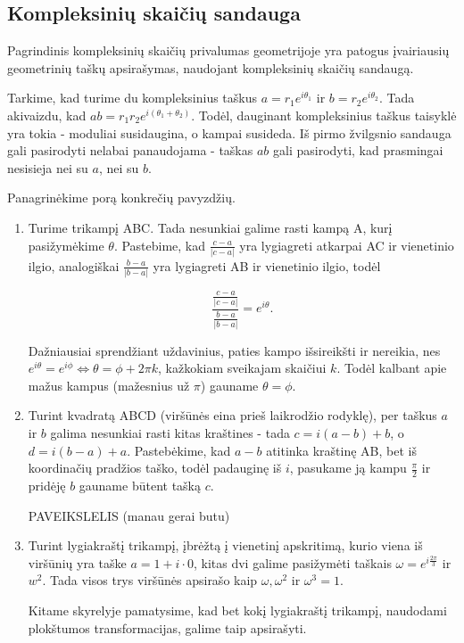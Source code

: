\documentclass[11pt,a4paper,twoside]{book}
\theoremstyle{definition} \newtheorem*{api}{Apibrėžimas}
\theoremstyle{remark} \newtheorem*{pastaba}{Pastaba}
\begin{document}
\subsection*{Kompleksinių skaičių sandauga}
Pagrindinis kompleksinių skaičių privalumas geometrijoje yra patogus įvairiausių geometrinių taškų apsirašymas, naudojant kompleksinių skaičių sandaugą.

Tarkime, kad turime du kompleksinius taškus $a=r_1 e^{i\theta _1}$ ir $b=r_2 e^{i\theta_2}$. Tada akivaizdu, kad $ab=r_1r_2e^{i(\theta_1+\theta_2)}$. Todėl, dauginant kompleksinius taškus taisyklė yra tokia - moduliai susidaugina, o kampai susideda. Iš pirmo žvilgsnio sandauga gali pasirodyti nelabai panaudojama - taškas $ab$ gali pasirodyti, kad prasmingai nesisieja nei su $a$, nei su $b$.  

Panagrinėkime porą konkrečių pavyzdžių. 
\begin{enumerate}
\item Turime trikampį ABC. Tada nesunkiai galime rasti kampą A, kurį pasižymėkime $\theta$. Pastebime, kad $\frac{c-a}{|c-a|}$ yra lygiagreti atkarpai AC ir vienetinio ilgio, analogiškai $\frac{b-a}{|b-a|}$ yra lygiagreti AB ir vienetinio ilgio, todėl 

$$\dfrac{\displaystyle \frac{c-a}{|c-a|}}{\displaystyle \frac{b-a}{|b-a|}}=e^{i\theta}.$$

Dažniausiai sprendžiant uždavinius, paties kampo išsireikšti ir nereikia, nes $e^{i\theta} = e^{i\phi} \Leftrightarrow \theta = \phi + 2\pi k$, kažkokiam sveikajam skaičiui $k$. Todėl kalbant apie mažus kampus (mažesnius už $\pi$) gauname $\theta = \phi $.



\item
Turint kvadratą ABCD (viršūnės eina prieš laikrodžio rodyklę), per taškus $a$ ir $b$ galima nesunkiai rasti kitas kraštines - tada $c= i(a-b)+b$, o $d=i(b-a) + a$. Pastebėkime, kad $a-b$ atitinka kraštinę AB, bet iš koordinačių pradžios taško, todėl padauginę iš $i$, pasukame ją kampu $\frac{\pi}{2}$ ir pridėję $b$ gauname būtent tašką $c$.

PAVEIKSLELIS (manau gerai butu)

\item
Turint lygiakraštį trikampį, įbrėžtą į vienetinį apskritimą, kurio viena iš viršūnių yra taške $a=1+i\cdot 0$, kitas dvi galime pasižymėti taškais $\omega=e^{i\frac{2\pi}{3}}$ ir $w^2$. Tada visos trys viršūnės apsirašo kaip $\omega, \omega^2$ ir $\omega^3=1$. 

Kitame skyrelyje pamatysime, kad bet kokį lygiakraštį trikampį, naudodami plokštumos transformacijas, galime taip apsirašyti.

\end{enumerate}
\end{document}
